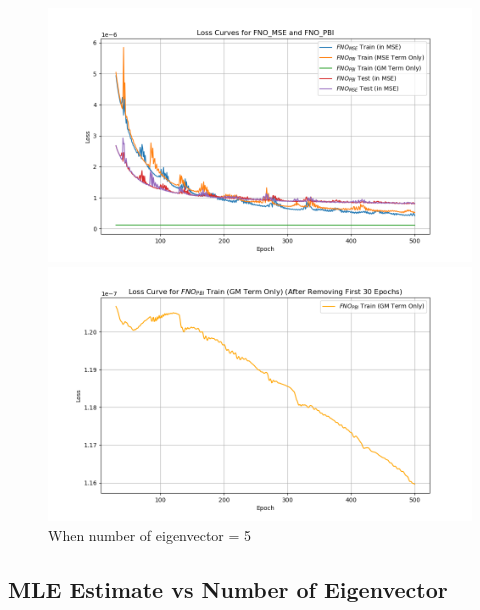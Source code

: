 \documentclass[
]{article}
\begin{document}
\begin{figure}

\begin{minipage}{\linewidth}

\includegraphics[width=1\textwidth,height=\textheight]{../../test/all_loss_5.png}

\end{minipage}%
\newline
\begin{minipage}{\linewidth}

\includegraphics[width=1\textwidth,height=\textheight]{../../test/PBI_term_5.png}

\end{minipage}%

\caption{\label{fig-eig1000}When number of eigenvector = 5}

\end{figure}%

\subsection{MLE Estimate vs Number of
Eigenvector}\label{mle-estimate-vs-number-of-eigenvector}
\end{document}
